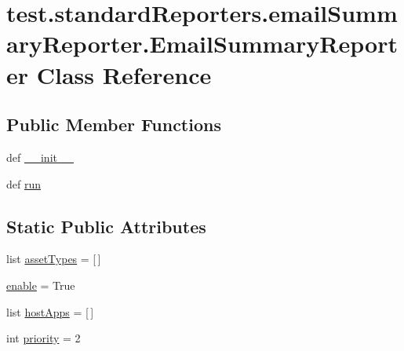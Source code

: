 \hypertarget{classtest_1_1standardReporters_1_1emailSummaryReporter_1_1EmailSummaryReporter}{\section{test.\-standard\-Reporters.\-email\-Summary\-Reporter.\-Email\-Summary\-Reporter \-Class \-Reference}
\label{db/db5/classtest_1_1standardReporters_1_1emailSummaryReporter_1_1EmailSummaryReporter}
}
\subsection*{\-Public \-Member \-Functions}
\begin{DoxyCompactItemize}
\item 
def \hyperlink{classtest_1_1standardReporters_1_1emailSummaryReporter_1_1EmailSummaryReporter_a0c3e7198bd55a42f0420ff8479ff8997}{\-\_\-\-\_\-init\-\_\-\-\_\-}
\item 
def \hyperlink{classtest_1_1standardReporters_1_1emailSummaryReporter_1_1EmailSummaryReporter_a7f5baac316aba3bd40bfb2e7e0b71b00}{run}
\end{DoxyCompactItemize}
\subsection*{\-Static \-Public \-Attributes}
\begin{DoxyCompactItemize}
\item 
list \hyperlink{classtest_1_1standardReporters_1_1emailSummaryReporter_1_1EmailSummaryReporter_aec9cbf3d966caba29028e20cefda9b3e}{asset\-Types} = \mbox{[}$\,$\mbox{]}
\item 
\hyperlink{classtest_1_1standardReporters_1_1emailSummaryReporter_1_1EmailSummaryReporter_ac76519e5c6883a4a4f49c6e15dabcd34}{enable} = \-True
\item 
list \hyperlink{classtest_1_1standardReporters_1_1emailSummaryReporter_1_1EmailSummaryReporter_a681d3a9343df01f5bf19cbdfb4d33a61}{host\-Apps} = \mbox{[}$\,$\mbox{]}
\item 
int \hyperlink{classtest_1_1standardReporters_1_1emailSummaryReporter_1_1EmailSummaryReporter_a5365747d8ef7f3c9a64ecb10cd7f4d16}{priority} = 2
\end{DoxyCompactItemize}



